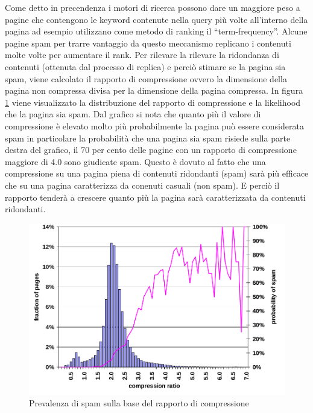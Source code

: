 Come detto in precendenza i  motori di ricerca possono dare un maggiore peso a pagine che contengono le keyword contenute nella query più volte all'interno della pagina ad esempio utilizzano come metodo di ranking il ``term-frequency''. Alcune pagine spam per trarre vantaggio da questo meccanismo replicano i contenuti molte volte per aumentare il rank. Per rilevare la rilevare la ridondanza di contenuti (ottenuta dal processo di replica) e perciò stimare se la pagina sia spam, viene calcolato il rapporto di compressione ovvero la dimensione della pagina non compressa divisa per la dimensione della pagina compressa. In figura \ref{fig:fetterly8} viene visualizzato la distribuzione del rapporto di compressione e la likelihood che la pagina sia spam. Dal grafico si nota che quanto più il valore di compressione è elevato molto più probabilmente la pagina può essere considerata spam in particolare  la probabilità che una pagina sia spam risiede sulla parte destra del grafico, il 70 per cento delle pagine con un rapporto di compressione maggiore di 4.0 sono giudicate spam. Questo è dovuto al fatto che una compressione su una pagina piena di contenuti ridondanti (spam) sarà più efficace che su una pagina caratterizza da conenuti casuali (non spam). E perciò il rapporto tenderà a crescere quanto più la pagina sarà caratterizzata da contenuti ridondanti.
\begin{figure}[htbp]
\centering
\includegraphics[width=12cm]{immagini/fetterly/fetterly8}
\caption{Prevalenza di spam sulla base del rapporto di compressione}
\label{fig:fetterly8}
\end{figure}

